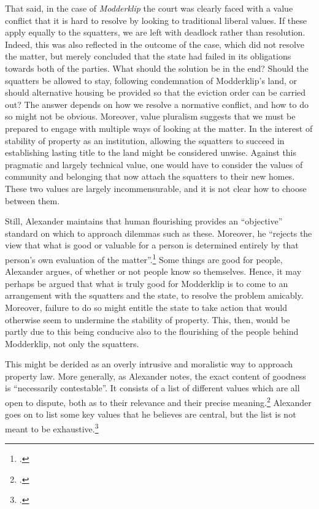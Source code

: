 That said, in the case of {\it Modderklip} the court was clearly faced with a value conflict that it is hard to resolve by looking to traditional liberal values. If these apply equally to the squatters, we are left with deadlock rather than resolution. Indeed, this was also reflected in the outcome of the case, which did not resolve the matter, but merely concluded that the state had failed in its obligations towards both of the parties. What should the solution be in the end? Should the squatters be allowed to stay, following condemnation of Modderklip's land, or should alternative housing be provided so that the eviction order can be carried out? The answer depends on how we resolve a normative conflict, and how to do so might not be obvious. Moreover, value pluralism suggests that we must be prepared to engage with multiple ways of looking at the matter. In the interest of stability of property as an institution, allowing the squatters to succeed in establishing lasting title to the land might be considered unwise. Against this pragmatic and largely technical value, one would have to consider the values of community and belonging that now attach the squatters to their new homes. These two values are largely incommensurable, and it is not clear how to choose between them.

Still, Alexander maintains that human flourishing provides an ``objective'' standard on which to approach dilemmas such as these. Moreover, he ``rejects the view that what is good or valuable for a person is determined entirely by that person's own evaluation of the matter''.\footcite[1263]{alexander14} Some things are good for people, Alexander argues,  of whether or not people know so themselves. Hence, it may perhaps be argued that what is truly good for Modderklip is to come to an arrangement with the squatters and the state, to resolve the problem amicably. Moreover, failure to do so might entitle the state to take action that would otherwise seem to undermine the stability of property. This, then, would be partly due to this being conducive also to the flourishing of the people behind Modderklip, not only the squatters.

This might be derided as an overly intrusive and moralistic way to approach property law. More generally, as Alexander notes, the exact content of goodness is ``necessarily contestable''. It consists of a list of different values which are all open to dispute, both as to their relevance and their precise meaning.\footcite[1263]{alexander14} Alexander goes on to list some key values that he believes are central, but the list is not meant to be exhaustive.\footcite[1764-1776]{alexander14}

